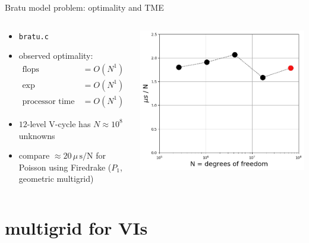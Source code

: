 \documentclass[svgnames,
               hyperref={colorlinks,citecolor=DeepPink4,linkcolor=FireBrick,urlcolor=Maroon},
               usepdftitle=false]  %
               {beamer}
\begin{document}
\begin{frame}{Bratu model problem: optimality and TME}

\begin{columns}
\begin{column}{0.45\textwidth}
\begin{itemize}
\item \texttt{bratu.c}
\item observed optimality:
\begin{align*}
\text{flops} &= O(N^1) \\
\text{exp evaluations} &= O(N^1) \\
\text{processor time} &= O(N^1)
\end{align*}
\item {\color{FireBrick} $12$-level V-cycle} has $N\approx 10^8$ unknowns
\item compare $\approx 20\,\mu\,\text{s}/\text{N}$ for Poisson using Firedrake ($P_1$, geometric multigrid)
\end{itemize}
\end{column}
\begin{column}{0.55\textwidth}
\includegraphics[width=\textwidth]{figs/bratu-time.png}
\end{column}
\end{columns}
\end{frame}


\section{multigrid for VIs}
\end{document}
